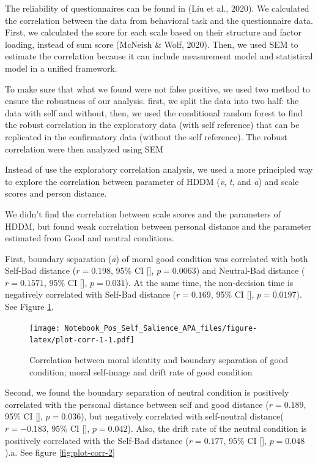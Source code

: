 \documentclass[
  english,
  man]{apa6}
\begin{document}
The reliability of questionnaires can be found in (Liu et al., 2020). We calculated the correlation between the data from behavioral task and the questionnaire data. First, we calculated the score for each scale based on their structure and factor loading, instead of sum score (McNeish \& Wolf, 2020). Then, we used SEM to estimate the correlation because it can include measurement model and statistical model in a unified framework.

To make sure that what we found were not false positive, we used two method to ensure the robustness of our analysis. first, we split the data into two half: the data with self and without, then, we used the conditional random forest to find the robust correlation in the exploratory data (with self reference) that can be replicated in the confirmatory data (without the self reference). The robust correlation were then analyzed using SEM

Instead of use the exploratory correlation analysis, we used a more principled way to explore the correlation between parameter of HDDM (\emph{v}, \emph{t}, and \emph{a}) and scale scores and person distance.

We didn't find the correlation between scale scores and the parameters of HDDM, but found weak correlation between personal distance and the parameter estimated from Good and neutral conditions.

First, boundary separation (\emph{a}) of moral good condition was correlated with both Self-Bad distance (\(r = 0.198\), 95\% CI {[}{]}, \(p = 0.0063\)) and Neutral-Bad distance (\(r = 0.1571\), 95\% CI {[}{]}, \(p = 0.031\)). At the same time, the non-decision time is negatively correlated with Self-Bad distance (\(r = 0.169\), 95\% CI {[}{]}, \(p = 0.0197\)). See Figure \ref{fig:plot-corr-1}.

\begin{figure}
\centering
\texttt{[image: Notebook\_Pos\_Self\_Salience\_APA\_files/figure-latex/plot-corr-1-1.pdf]}
\caption{\label{fig:plot-corr-1}Correlation between moral identity and boundary separation of good condition; moral self-image and drift rate of good condition}
\end{figure}

Second, we found the boundary separation of neutral condition is positively correlated with the personal distance between self and good distance (\(r = 0.189\), 95\% CI {[}{]}, \(p = 0.036\)), but negatively correlated with self-neutral distance(\(r = -0.183\), 95\% CI {[}{]}, \(p = 0.042\)). Also, the drift rate of the neutral condition is positively correlated with the Self-Bad distance (\(r = 0.177\), 95\% CI {[}{]}, \(p = 0.048\)).a. See figure \ref{fig:plot-corr-2}
\end{document}
